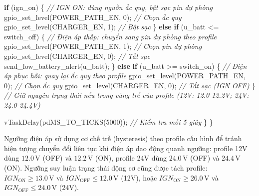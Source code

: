 \documentclass[a4paper]{extarticle}
\newenvironment{Shaded}{}{}
\newcommand{\CommentTok}[1]{\textcolor[rgb]{0.38,0.63,0.69}{\textit{#1}}}
\newcommand{\ControlFlowTok}[1]{\textcolor[rgb]{0.00,0.44,0.13}{\textbf{#1}}}
\newcommand{\DecValTok}[1]{\textcolor[rgb]{0.25,0.63,0.44}{#1}}
\newcommand{\NormalTok}[1]{#1}
\newcommand{\OperatorTok}[1]{\textcolor[rgb]{0.40,0.40,0.40}{#1}}
\begin{document}
\begin{Shaded}
\begin{Highlighting}[]
        \ControlFlowTok{if} \OperatorTok{(}\NormalTok{ign\_on}\OperatorTok{)} \OperatorTok{\{}
            \CommentTok{// IGN ON: dùng nguồn ắc quy, bật sạc pin dự phòng}
\NormalTok{            gpio\_set\_level}\OperatorTok{(}\NormalTok{POWER\_PATH\_EN}\OperatorTok{,} \DecValTok{0}\OperatorTok{);}   \CommentTok{// Chọn ắc quy}
\NormalTok{            gpio\_set\_level}\OperatorTok{(}\NormalTok{CHARGER\_EN}\OperatorTok{,} \DecValTok{1}\OperatorTok{);}       \CommentTok{// Bật sạc}
        \OperatorTok{\}} \ControlFlowTok{else} \ControlFlowTok{if} \OperatorTok{(}\NormalTok{u\_batt }\OperatorTok{\textless{}=}\NormalTok{ switch\_off}\OperatorTok{)} \OperatorTok{\{}
            \CommentTok{// Điện áp thấp: chuyển sang pin dự phòng theo profile}
\NormalTok{            gpio\_set\_level}\OperatorTok{(}\NormalTok{POWER\_PATH\_EN}\OperatorTok{,} \DecValTok{1}\OperatorTok{);}   \CommentTok{// Chọn pin dự phòng}
\NormalTok{            gpio\_set\_level}\OperatorTok{(}\NormalTok{CHARGER\_EN}\OperatorTok{,} \DecValTok{0}\OperatorTok{);}       \CommentTok{// Tắt sạc}
\NormalTok{            send\_low\_battery\_alert}\OperatorTok{(}\NormalTok{u\_batt}\OperatorTok{);}
        \OperatorTok{\}} \ControlFlowTok{else} \ControlFlowTok{if} \OperatorTok{(}\NormalTok{u\_batt }\OperatorTok{\textgreater{}=}\NormalTok{ switch\_on}\OperatorTok{)} \OperatorTok{\{}
            \CommentTok{// Điện áp phục hồi: quay lại ắc quy theo profile}
\NormalTok{            gpio\_set\_level}\OperatorTok{(}\NormalTok{POWER\_PATH\_EN}\OperatorTok{,} \DecValTok{0}\OperatorTok{);}   \CommentTok{// Chọn ắc quy}
\NormalTok{            gpio\_set\_level}\OperatorTok{(}\NormalTok{CHARGER\_EN}\OperatorTok{,} \DecValTok{0}\OperatorTok{);}       \CommentTok{// Tắt sạc (IGN OFF)}
        \OperatorTok{\}}
        \CommentTok{// Giữ nguyên trạng thái nếu trong vùng trễ của profile (12V: 12.0{-}12.2V; 24V: 24.0{-}24.4V)}

\NormalTok{        vTaskDelay}\OperatorTok{(}\NormalTok{pdMS\_TO\_TICKS}\OperatorTok{(}\DecValTok{5000}\OperatorTok{));}  \CommentTok{// Kiểm tra mỗi 5 giây}
    \OperatorTok{\}}
\OperatorTok{\}}
\end{Highlighting}
\end{Shaded}

Ngưỡng điện áp sử dụng cơ chế trễ (hysteresis) theo profile cấu hình để
tránh hiện tượng chuyển đổi liên tục khi điện áp dao động quanh ngưỡng:
profile 12V dùng \(12.0\,\mathrm{V}\) (OFF) và \(12.2\,\mathrm{V}\) (ON),
profile 24V dùng \(24.0\,\mathrm{V}\) (OFF) và \(24.4\,\mathrm{V}\) (ON).
Ngưỡng suy luận trạng thái động cơ cũng được tách profile:
\(IGN_{\mathrm{ON}} \ge 13.0\,\mathrm{V}\) và
\(IGN_{\mathrm{OFF}} \le 12.0\,\mathrm{V}\) (12V), hoặc
\(IGN_{\mathrm{ON}} \ge 26.0\,\mathrm{V}\) và
\(IGN_{\mathrm{OFF}} \le 24.0\,\mathrm{V}\) (24V).
\end{document}
